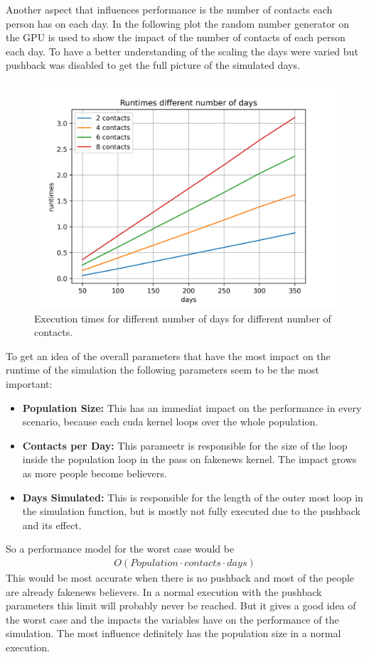 \documentclass[12pt,a4paper]{article}
\begin{document}
Another aspect that influences performance is the number of contacts each person has on each day. In the following plot the random number generator on the GPU is used to show the impact of the number of contacts of each person each day. To have a better understanding of the scaling the days were varied but pushback was disabled to get the full picture of the simulated days. 
\begin{figure}[H]
  \centering
  \includegraphics[width=12cm]{../contacts.png}
  \caption{Execution times for different number of days for  different number of contacts.}
  \label{fig:contacts}
\end{figure}
To get  an idea of the overall parameters that have the most impact on the runtime of the simulation the following parameters seem to be the most important: 
\begin{itemize}
  \item \textbf{Population Size: } This has an immediat impact on the performance in every scenario, because each cuda kernel loops over the whole population.
  \item \textbf{Contacts per Day: } This parameetr is responsible for the size of the loop inside the population loop in the pass on  fakenews kernel. The impact grows as more people become believers.
  \item \textbf{Days Simulated: } This is responsible for the length of the outer most loop in the simulation function, but is mostly not fully executed due to the pushback and its effect.
\end{itemize}
So a performance model for the worst case would be 
\begin{align}
  O(Population \cdot contacts \cdot days)
\end{align}
This would be most accurate when there is no pushback and most of the people are already fakenews believers. In a normal execution with the pushback parameters this limit will probably never be reached. But it gives a good idea of the worst case and the impacts the variables have on the performance of the simulation. The most influence definitely has the population size in a normal execution.
\end{document}
